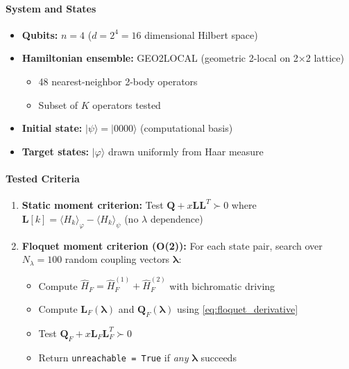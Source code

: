 \paragraph{System and States}
\begin{itemize}
\item \textbf{Qubits:} $n = 4$ ($d = 2^4 = 16$ dimensional Hilbert space)
\item \textbf{Hamiltonian ensemble:} GEO2LOCAL (geometric 2-local on 2×2 lattice)
  \begin{itemize}
  \item 48 nearest-neighbor 2-body operators
  \item Subset of $K$ operators tested
  \end{itemize}
\item \textbf{Initial state:} $|\psi\rangle = |0000\rangle$ (computational basis)
\item \textbf{Target states:} $|\varphi\rangle$ drawn uniformly from Haar measure
\end{itemize}

\paragraph{Tested Criteria}
\begin{enumerate}
\item \textbf{Static moment criterion:} Test $\mathbf{Q} + x \mathbf{L} \mathbf{L}^T \succ 0$ where $\mathbf{L}[k] = \langle H_k \rangle_\varphi - \langle H_k \rangle_\psi$ (no $\lambda$ dependence)

\item \textbf{Floquet moment criterion (O(2)):} For each state pair, search over $N_\lambda = 100$ random coupling vectors $\boldsymbol{\lambda}$:
  \begin{itemize}
  \item Compute $\hat{H}_F = \hat{H}_F^{(1)} + \hat{H}_F^{(2)}$ with bichromatic driving
  \item Compute $\mathbf{L}_F(\boldsymbol{\lambda})$ and $\mathbf{Q}_F(\boldsymbol{\lambda})$ using \cref{eq:floquet_derivative}
  \item Test $\mathbf{Q}_F + x \mathbf{L}_F \mathbf{L}_F^T \succ 0$
  \item Return \texttt{unreachable = True} if \emph{any} $\boldsymbol{\lambda}$ succeeds
  \end{itemize}
\end{enumerate}

